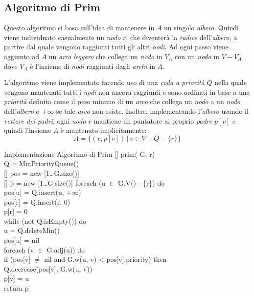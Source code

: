 \subsection{Algoritmo di Prim}
Questo algoritmo si basa sull'idea di mantenere in $A$ un singolo \emph{albero}.
Quindi viene individuato casualmente un \emph{nodo} $r$, che diventerà la
\emph{radice} dell'\emph{albero}, a partire dal quale vengono raggiunti tutti
gli altri \emph{nodi}. Ad ogni passo viene aggiunto ad $A$ un \emph{arco
leggero} che collega un \emph{nodo} in $V_A$ con un \emph{nodo} in $V-V_A$,
dove $V_A$ è l'insieme di \emph{nodi} raggiunti dagli \emph{archi} in $A$.

L'algoritmo viene implementato facendo uso di una \emph{coda a priorità} $Q$
nella quale vengono mantenuti tutti i \emph{nodi} non ancora raggiunti e sono
ordinati in base a una \emph{priorità} definita come il peso minimo di un
\emph{arco} che collega un \emph{nodo} a un \emph{nodo} dell'\emph{albero} o
$+\infty$ se tale \emph{arco} non esiste. Inoltre, implementando l'\emph{albero}
usando il \emph{vettore dei padri}, ogni \emph{nodo} $v$ mantiene un puntatore
al proprio \emph{padre} $p[v]$ e quindi l'insieme $A$ è mantenuto implicitamente:
\[A=\{(v,p[v])\,|\,v\in V-Q-\{r\}\}\]

\begin{minicode}{Implementazione Algoritmo di Prim}
\ind{}[] prim( G,  r)\\
     Q = MinPriorityQueue()\\
    [] pos = new [1\dots G.size()]\\
    [] p = new [1\dots G.size()]\hfill{}
    \indf foreach (u $\in$ G.V() - \{r\}) do\\
        pos[u] = Q.insert(u, $+\infty$)\\
    \indf pos[r] = Q.insert(r, 0)\\
    \indf p[r] = 0\\
    \indf while (not Q.isEmpty()) do\\
         u = Q.deleteMin()\\
        pos[u] = nil\\
        \indff foreach (v $\in$ G.adj(u)) do\\
            \indfff if (pos[v] $\neq$ nil and G.w(u, v) < pos[v].priority) then\\
                Q.decrease(pos[v], G.w(u, v))\\
                p[v] = u\\
    \indf return p
\end{minicode}

